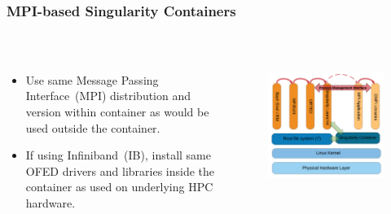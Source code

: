 \documentclass{beamer}
\begin{document}
\begin{frame}
   \frametitle{MPI-based Singularity Containers}
   \begin{columns}
      \begin{column}{0.6\textwidth}
         \begin{itemize}
            \setlength\itemsep{1.0em}
            \item Use same Message Passing Interface~(MPI) distribution
               and version within container as would be used outside the
               container.
            \item If using Infiniband~(IB), install same OFED drivers and
               libraries inside the container as used on underlying HPC
               hardware.
         \end{itemize}
      \end{column}
      \hfill
      \begin{column}{0.5\textwidth}
         \begin{figure}[htbp]
            \includegraphics[width=1.0\textwidth]{images/singularity-container-architecture-with-mpi.png}
         \end{figure}
      \end{column}
   \end{columns}
\end{frame}
\end{document}
